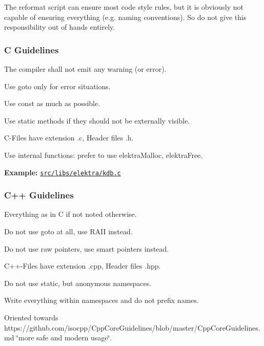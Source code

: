 The reformat script can ensure most code style rules, but it is obviously not capable of ensuring everything (e.\+g. naming conventions). So do not give this responsibility out of hands entirely.

\subsubsection*{C Guidelines}


\begin{DoxyItemize}
\item The compiler shall not emit any warning (or error).
\item Use goto only for error situations.
\item Use {\ttfamily const} as much as possible.
\item Use {\ttfamily static} methods if they should not be externally visible.
\item C-\/\+Files have extension {\ttfamily .c}, Header files {\ttfamily .h}.
\item Use internal functions\+: prefer to use elektra\+Malloc, elektra\+Free.
\end{DoxyItemize}

{\bfseries Example\+:} \href{/home/markus/Projekte/Elektra/current/src/libs/elektra/kdb.c}{\tt src/libs/elektra/kdb.\+c}

\subsubsection*{C++ Guidelines}


\begin{DoxyItemize}
\item Everything as in C if not noted otherwise.
\item Do not use goto at all, use R\+A\+II instead.
\item Do not use raw pointers, use smart pointers instead.
\item C++-\/\+Files have extension {\ttfamily .cpp}, Header files {\ttfamily .hpp}.
\item Do not use {\ttfamily static}, but anonymous namespaces.
\item Write everything within namespaces and do not prefix names.
\item Oriented towards https\+://github.com/isocpp/\+Cpp\+Core\+Guidelines/blob/master/\+Cpp\+Core\+Guidelines.\+md \char`\"{}more safe and modern usage\char`\"{}.
\end{DoxyItemize}

